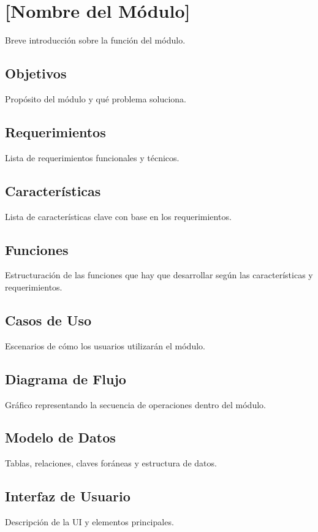 

\section{[Nombre del Módulo]}
Breve introducción sobre la función del módulo.

\subsection{Objetivos}
Propósito del módulo y qué problema soluciona.

\subsection{Requerimientos}
Lista de requerimientos funcionales y técnicos.

\subsection{Características}
Lista de características clave con base en los requerimientos.

\subsection{Funciones}
Estructuración de las funciones que hay que desarrollar según las características y requerimientos.

\subsection{Casos de Uso}
Escenarios de cómo los usuarios utilizarán el módulo.

\subsection{Diagrama de Flujo}
Gráfico representando la secuencia de operaciones dentro del módulo.

\subsection{Modelo de Datos}
Tablas, relaciones, claves foráneas y estructura de datos.

\subsection{Interfaz de Usuario}
Descripción de la UI y elementos principales.

